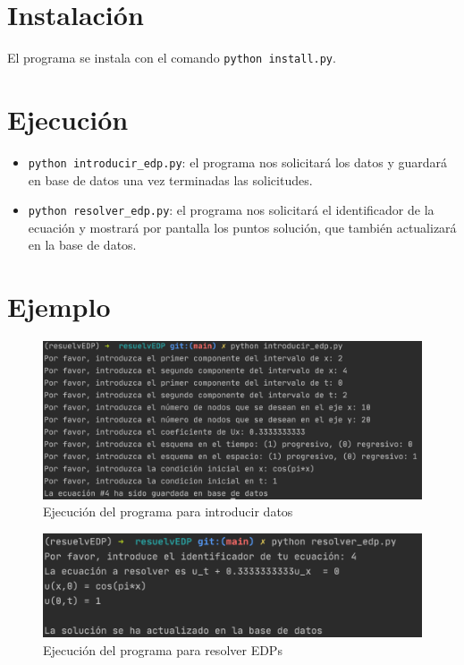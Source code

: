 \documentclass[a4paper,12pt]{article}
\begin{document}
\section*{Instalación}

El programa se instala con el comando \texttt{python install.py}.

\section*{Ejecución}

\begin{itemize}
	\item \texttt{python introducir\_edp.py}: el programa nos solicitará los datos y guardará en base de datos una vez terminadas las solicitudes.
	\item \texttt{python resolver\_edp.py}: el programa nos solicitará el identificador de la ecuación y mostrará por pantalla los puntos solución, que también actualizará en la base de datos.
\end{itemize}

\section*{Ejemplo}

\begin{figure}[H]
  \centering
  \includegraphics[width=12cm]{ejemplo1}
  \caption{Ejecución del programa para introducir datos}
  \label{fig:ejemplo1}
\end{figure}

\begin{figure}[H]
  \centering
  \includegraphics[width=12cm]{ejemplo2}
  \caption{Ejecución del programa para resolver EDPs}
  \label{fig:ejemplo2}
\end{figure}
\end{document}
